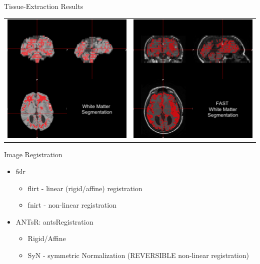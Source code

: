 \documentclass[11pt]{beamer}\usepackage[]{graphicx}\usepackage[]{color}
\begin{document}
\begin{frame}[fragile]{Tissue-Extraction Results}

\begin{tabular}{cc}
\includegraphics[width=0.5\linewidth]{WM_Image.png} & \includegraphics[width=0.5\linewidth]{FAST_Image.png}
\end{tabular}

\end{frame}


\begin{frame}[fragile]{Image Registration}

\begin{itemize}

\item fslr
  \begin{itemize}
  
  \item flirt - linear (rigid/affine) registration
  \item fnirt - non-linear registration
  
  \end{itemize}
  
\item ANTsR: antsRegistration
  \begin{itemize}
  
  \item Rigid/Affine
  \item SyN - symmetric Normalization (REVERSIBLE non-linear registration)
  
  \end{itemize}  

\end{itemize}

\end{frame}
\end{document}
